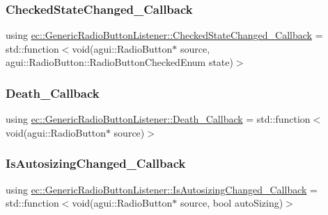\subsubsection{\texorpdfstring{Checked\+State\+Changed\+\_\+\+Callback}{CheckedStateChanged\_Callback}}
{\footnotesize\ttfamily using \mbox{\hyperlink{classec_1_1_generic_radio_button_listener_aa2ce6fc7dec8cfb263608c59f6eb338f}{ec\+::\+Generic\+Radio\+Button\+Listener\+::\+Checked\+State\+Changed\+\_\+\+Callback}} =  std\+::function$<$void(agui\+::\+Radio\+Button$\ast$ source, agui\+::\+Radio\+Button\+::\+Radio\+Button\+Checked\+Enum state)$>$}

\mbox{\label{classec_1_1_generic_radio_button_listener_aa760bb857feacd099dadc0a1b182c40f}} 
\subsubsection{\texorpdfstring{Death\+\_\+\+Callback}{Death\_Callback}}
{\footnotesize\ttfamily using \mbox{\hyperlink{classec_1_1_generic_radio_button_listener_aa760bb857feacd099dadc0a1b182c40f}{ec\+::\+Generic\+Radio\+Button\+Listener\+::\+Death\+\_\+\+Callback}} =  std\+::function$<$void(agui\+::\+Radio\+Button$\ast$ source)$>$}

\mbox{\label{classec_1_1_generic_radio_button_listener_adc874051d63443a9eb1ab194a1730306}} 
\subsubsection{\texorpdfstring{Is\+Autosizing\+Changed\+\_\+\+Callback}{IsAutosizingChanged\_Callback}}
{\footnotesize\ttfamily using \mbox{\hyperlink{classec_1_1_generic_radio_button_listener_adc874051d63443a9eb1ab194a1730306}{ec\+::\+Generic\+Radio\+Button\+Listener\+::\+Is\+Autosizing\+Changed\+\_\+\+Callback}} =  std\+::function$<$void(agui\+::\+Radio\+Button$\ast$ source, bool auto\+Sizing)$>$}

